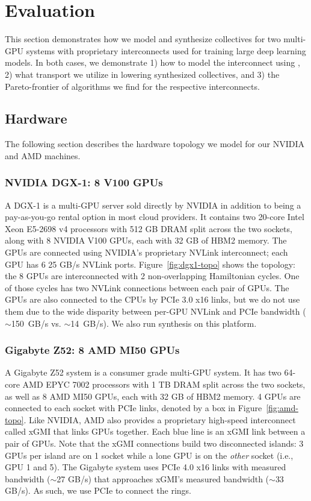 
\section{Evaluation}
This section demonstrates how we model and synthesize collectives for
two multi-GPU systems with proprietary interconnects used for training
large deep learning models. In both cases, we demonstrate 1) how to
model the interconnect using \tool, 2) what transport we utilize in
lowering synthesized collectives, and 3) the Pareto-frontier of
algorithms we find for the respective interconnects.

\subsection{Hardware}
The following section describes the hardware topology we model for our
NVIDIA and AMD machines.

\subsubsection{NVIDIA DGX-1: 8 V100 GPUs}
A DGX-1 is a multi-GPU server sold directly by NVIDIA in addition to
being a pay-as-you-go rental option in most cloud providers.  It
contains two 20-core Intel Xeon E5-2698 v4 processors with 512 GB DRAM
split across the two sockets, along with 8 NVIDIA V100 GPUs, each with
32 GB of HBM2 memory. The GPUs are connected using NVIDIA's
proprietary NVLink interconnect; each GPU has 6 25 GB/s NVLink ports.
Figure~\ref{fig:dgx1-topo} shows the topology: the 8 GPUs are
interconnected with 2 non-overlapping Hamiltonian cycles.  One of
those cycles has two NVLink connections between each pair of GPUs. The
GPUs are also connected to the CPUs by PCIe 3.0 x16 links, but we do
not use them due to the wide disparity between per-GPU NVLink and PCIe
bandwidth ($\sim$150~GB/s vs. $\sim$14~GB/s). We also run synthesis on
this platform.

\subsubsection{Gigabyte Z52: 8 AMD MI50 GPUs}
A Gigabyte Z52 system is a consumer grade multi-GPU system. It has two
64-core AMD EPYC 7002 processors with 1 TB DRAM split across the two
sockets, as well as 8 AMD MI50 GPUs, each with 32 GB of HBM2 memory. 4
GPUs are connected to each socket with PCIe links, denoted by a box in
Figure~\ref{fig:amd-topo}. Like NVIDIA, AMD also provides a
proprietary high-speed interconnect called xGMI that links GPUs
together.  Each blue line is an xGMI link between a pair of GPUs. Note
that the xGMI connections build two disconnected islands: 3 GPUs per
island are on 1 socket while a lone GPU is on the \emph{other} socket
(i.e., GPU 1 and 5). The Gigabyte system uses PCIe 4.0 x16 links with
measured bandwidth ($\sim$27 GB/s) that approaches xGMI's measured
bandwidth ($\sim$33 GB/s). As such, we use PCIe to connect the rings.

